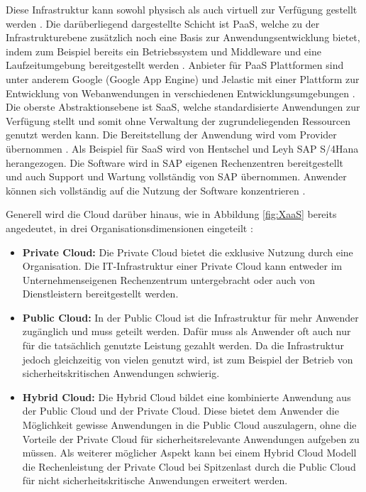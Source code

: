 Diese Infrastruktur kann sowohl physisch als auch virtuell zur Verfügung gestellt werden \cite[Vgl.][S. 9f]{Reinheimer2018}. Die darüberliegend dargestellte Schicht ist \ac{PaaS}, welche zu der Infrastrukturebene zusätzlich noch eine Basis zur Anwendungsentwicklung bietet, indem zum Beispiel bereits ein Betriebssystem und Middleware und eine Laufzeitumgebung bereitgestellt werden \cite[Vgl.][S. 10]{Reinheimer2018}. Anbieter für \ac{PaaS} Plattformen sind unter anderem Google (Google App Engine) und Jelastic mit einer Plattform zur Entwicklung von Webanwendungen in verschiedenen Entwicklungsumgebungen \cite[Vgl.][S. 13]{Reinheimer2018}. Die oberste Abstraktionsebene ist \ac{SaaS}, welche standardisierte Anwendungen zur Verfügung stellt und somit ohne Verwaltung der zugrundeliegenden Ressourcen genutzt werden kann. Die Bereitstellung der Anwendung wird vom Provider übernommen \cite[Vgl.][S. 11]{Reinheimer2018}. Als Beispiel für \ac{SaaS} wird von Hentschel und Leyh SAP S/4Hana herangezogen. Die Software wird in SAP eigenen Rechenzentren bereitgestellt und auch Support und Wartung vollständig von SAP übernommen. Anwender können sich vollständig auf die Nutzung der Software konzentrieren \cite[Vgl.][S. 14]{Reinheimer2018}. \pagebreak

Generell wird die Cloud darüber hinaus, wie in Abbildung \ref{fig:XaaS} bereits angedeutet, in drei Organisationsdimensionen eingeteilt \cite[Vgl. auch im Folgenden][S. 7ff]{Reinheimer2018}:
\begin{itemize}
\item \textbf{Private Cloud:} Die Private Cloud bietet die exklusive Nutzung durch eine Organisation. Die IT-Infrastruktur einer Private Cloud kann entweder im Unternehmenseigenen Rechenzentrum untergebracht oder auch von Dienstleistern bereitgestellt werden.
\item \textbf{Public Cloud:} In der Public Cloud ist die Infrastruktur für mehr Anwender zugänglich und muss geteilt werden. Dafür muss als Anwender oft auch nur für die tatsächlich genutzte Leistung gezahlt werden. Da die Infrastruktur jedoch gleichzeitig von vielen genutzt wird, ist zum Beispiel der Betrieb von sicherheitskritischen Anwendungen schwierig.
\item \textbf{Hybrid Cloud:} Die Hybrid Cloud bildet eine kombinierte Anwendung aus der Public Cloud und der Private Cloud. Diese bietet dem Anwender die Möglichkeit gewisse Anwendungen in die Public Cloud auszulagern, ohne die Vorteile der Private Cloud für sicherheitsrelevante Anwendungen aufgeben zu müssen. Als weiterer möglicher Aspekt kann bei einem Hybrid Cloud Modell die Rechenleistung der Private Cloud bei Spitzenlast durch die Public Cloud für nicht sicherheitskritische Anwendungen erweitert werden. 
\end{itemize} \pagebreak


